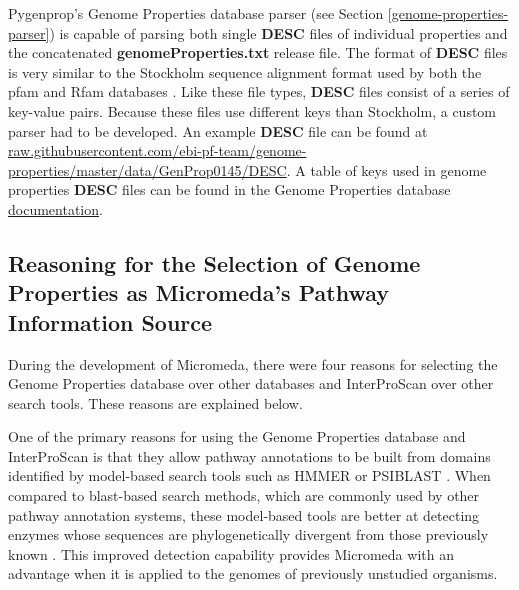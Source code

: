 Pygenprop's Genome Properties database parser (see Section \ref{genome-properties-parser}) is capable of parsing both single \textbf{DESC} files of individual properties and the concatenated \textbf{genomeProperties.txt} release file. The format of \textbf{DESC} files is very similar to the Stockholm sequence alignment format used by both the \gls{pfam} and Rfam databases \cite{bateman2004pfam, griffiths2003rfam}. Like these file types, \textbf{DESC} files consist of a series of key-value pairs. Because these files use different keys than Stockholm, a custom parser had to be developed. An example \textbf{DESC} file can be found at \href{raw.githubusercontent.com/ebi-pf-team/genome-properties/master/data/GenProp0145/DESC}{raw.githubusercontent.com/ebi-pf-team/genome-properties/master/data/GenProp0145/DESC}. A table of keys used in  genome properties \textbf{DESC} files can be found in the Genome Properties database \href{genome-properties.readthedocs.io/en/latest/flatfile.html\#desc-file}{documentation}.

\subsection{Reasoning for the Selection of Genome Properties as Micromeda's Pathway Information Source} \label{reason-for-genome-properties-selection}

During the development of Micromeda, there were four reasons for selecting the Genome Properties database over other databases and InterProScan over other search tools. These reasons are explained below.

One of the primary reasons for using the Genome Properties database and InterProScan is that they allow pathway annotations to be built from domains identified by model-based search tools such as HMMER \cite{eddy2011accelerated} or PSIBLAST \cite{altschul1997gapped}. When compared to \gls{blast}-based \cite{altschul1990basic} search methods, which are commonly used by other pathway annotation systems, these model-based tools are better at detecting enzymes whose sequences are phylogenetically divergent from those previously known \cite{eddy2011accelerated}. This improved detection capability provides Micromeda with an advantage when it is applied to the genomes of previously unstudied organisms.

